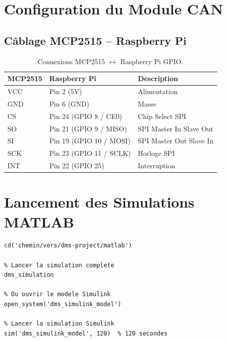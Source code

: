 \documentclass[12pt,a4paper,twoside]{report}
\begin{document}
\section{Configuration du Module CAN}

\subsection{Câblage MCP2515 -- Raspberry Pi}

\begin{table}[H]
\centering
\caption{Connexions MCP2515 $\leftrightarrow$ Raspberry Pi GPIO.}
\renewcommand{\arraystretch}{1.3}
\begin{tabular}{|l|l|l|}
\hline
\rowcolor{stellantisblue!15}
\textbf{MCP2515} & \textbf{Raspberry Pi} & \textbf{Description} \\
\hline
VCC & Pin 2 (5V) & Alimentation \\
\hline
GND & Pin 6 (GND) & Masse \\
\hline
CS & Pin 24 (GPIO 8 / CE0) & Chip Select SPI \\
\hline
SO & Pin 21 (GPIO 9 / MISO) & SPI Master In Slave Out \\
\hline
SI & Pin 19 (GPIO 10 / MOSI) & SPI Master Out Slave In \\
\hline
SCK & Pin 23 (GPIO 11 / SCLK) & Horloge SPI \\
\hline
INT & Pin 22 (GPIO 25) & Interruption \\
\hline
\end{tabular}
\end{table}

\section{Lancement des Simulations MATLAB}

\begin{lstlisting}[style=matlabstyle, caption={Lancement de la simulation MATLAB.}]
% Ouvrir MATLAB et naviguer vers le dossier du projet
cd('chemin/vers/dms-project/matlab')

% Lancer la simulation complete
dms_simulation

% Ou ouvrir le modele Simulink
open_system('dms_simulink_model')

% Lancer la simulation Simulink
sim('dms_simulink_model', 120)  % 120 secondes
\end{lstlisting}

\end{document}
